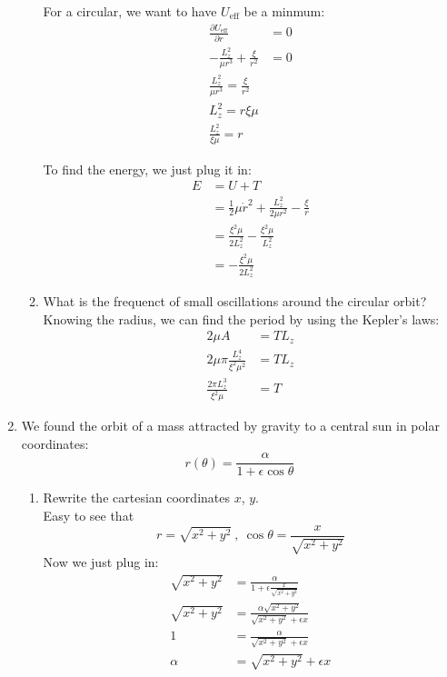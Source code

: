 \documentclass{article}
\begin{document}
\begin{enumerate}
\begin{enumerate}
            For a circular, we want to have $U_\text{eff}$ be a minmum:
            \begin{align*}
                \frac{\partial U_\text{eff}}{\partial r} &= 0 \\
                -\frac{L_z^2}{\mu r^3} + \frac{\xi}{r^2} &= 0 \\
                \frac{L_z^2}{\mu r^3} = \frac{\xi}{r^2} \\
                L_z^2 = r\xi \mu \\
                \frac{L_z^2}{\xi \mu} = r
            \end{align*}

            To find the energy, we just plug it in:
            \begin{align*}
                E &= U + T \\
                  &= \frac{1}{2}\mu \dot r^2 + \frac{L_z^2}{2\mu r^2} - \frac{\xi}{r} \\
                  &= \frac{\xi^2 \mu}{2L_z^2} - \frac{\xi^2\mu}{L_z^2} \\
                  &= -\frac{\xi^2 \mu}{2L_z^2}
            \end{align*}
            \item What is the frequenct of small oscillations around the circular orbit?\\

            Knowing the radius, we can find the period by using the Kepler's laws:
            \begin{align*}
                2\mu A &= TL_z \\
                2\mu \pi \frac{L_z^4}{\xi^2 \mu^2} &= TL_z \\
                \frac{2\pi L_z^3}{\xi^2\mu} &= T
            \end{align*}
        \end{enumerate}

        \item We found the orbit of a mass attracted by gravity to a central sun in polar coordinates:
        \[
        r(\theta) = \frac{\alpha}{1 + \epsilon\cos\theta}
        \]
        \begin{enumerate}
            \item Rewrite the cartesian coordinates $x$, $y$.\\

            Easy to see that
            \[
            r = \sqrt{x^2 + y^2} \ , \ \cos\theta = \frac{x}{\sqrt{x^2 + y^2}}
            \]
            Now we just plug in:
            \begin{align*}
                \sqrt{x^2 + y^2} &= \frac{\alpha}{1 + \epsilon\frac{x}{\sqrt{x^2 + y^2}}} \\
                \sqrt{x^2 + y^2} &= \frac{\alpha\sqrt{x^2+y^2}}{\sqrt{x^2+y^2} + \epsilon x} \\
                1 &= \frac{\alpha}{\sqrt{x^2+y^2} + \epsilon x}\\
                \alpha &= \sqrt{x^2+y^2} + \epsilon x
            \end{align*}


\end{enumerate}
\end{enumerate}
\end{document}
